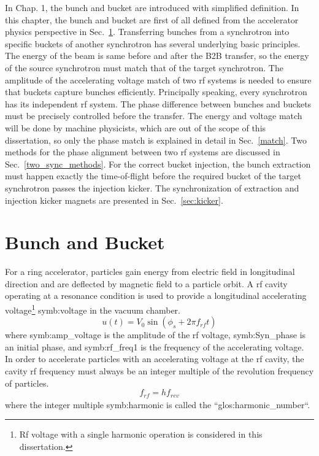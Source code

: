 In Chap. 1, the bunch and bucket are introduced with simplified definition. In this chapter, the bunch and bucket are first of all defined from the accelerator physics perspective in Sec.~\ref{bunch and bucket}. Transferring bunches from a synchrotron into specific buckets of another synchrotron has several underlying basic principles. The energy of the beam is same before and after the B2B transfer, so the energy of the source synchrotron must match that of the target synchrotron. The amplitude of the accelerating voltage match of two rf systems is needed to ensure that buckets capture bunches efficiently. Principally speaking, every synchrotron has its independent rf system. The phase difference between bunches and buckets must be precisely controlled before the transfer. The energy and voltage match will be done by machine physicists, which are out of the scope of this dissertation, so only the phase match is explained in detail in Sec.~\ref{match}. Two methods for the phase alignment between two rf systems are discussed in Sec.~\ref{two_sync_methods}. For the correct bucket injection, the bunch extraction must happen exactly the time-of-flight before the required bucket of the target synchrotron passes the injection kicker. The synchronization of extraction and injection kicker magnets are presented in Sec.~\ref{sec:kicker}.

\section{Bunch and Bucket}
\label{bunch and bucket}
For a ring accelerator, particles gain energy from electric field in longitudinal direction and are deflected by magnetic field to a particle orbit. A rf cavity operating at a resonance condition is used to provide a longitudinal accelerating voltage\footnote{Rf voltage with a single harmonic operation is considered in this dissertation.} \gls{symb:voltage} in the vacuum chamber.
\begin{equation}
u(t)=V_0\sin(\phi_\mathit{s}+2\pi f_\mathit{rf}t)
\end{equation}
where \gls{symb:amp_voltage} is the amplitude of the rf voltage, \gls{symb:Syn_phase} is an initial phase, and \gls{symb:rf_freq1} is the frequency of the accelerating voltage. In order to accelerate particles with an accelerating voltage at the rf cavity, the cavity rf frequency must always be an integer multiple of the revolution frequency of particles. 
\begin{equation}
	f_{\mathit{rf}}=hf_{\mathit{rev}}\label{harmonic_number}
\end{equation}
where the integer multiple \gls{symb:harmonic} is called the ``\gls{glos:harmonic_number}``. 

